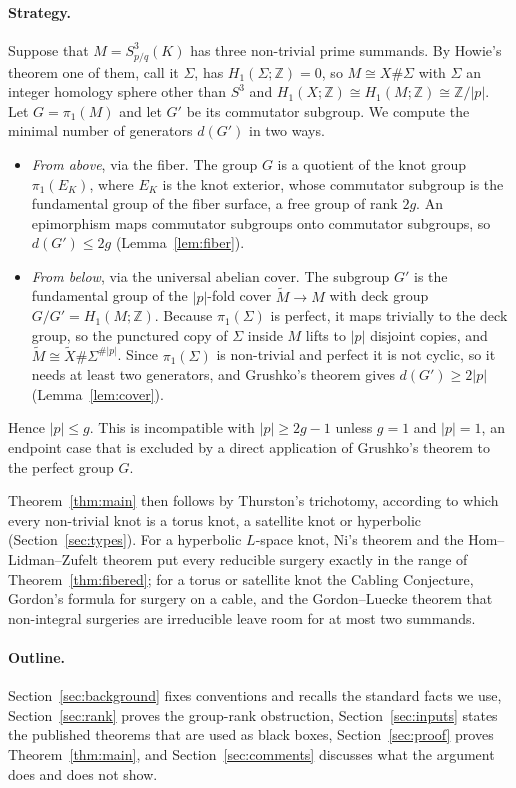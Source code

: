 \documentclass[11pt]{article}
\newcommand{\Z}{\mathbb Z}
\newcommand{\Surg}[2]{S^3_{#1}(#2)}
\newcommand{\rk}{d}
\theoremstyle{definition}
\theoremstyle{remark}
\begin{document}
\paragraph{Strategy.}
Suppose that \(M=\Surg{p/q}{K}\) has three non-trivial prime summands.
By Howie's theorem one of them, call it \(\Sigma\), has
\(H_1(\Sigma;\Z)=0\), so \(M\cong X\#\Sigma\) with \(\Sigma\) an integer
homology sphere other than \(S^3\) and \(H_1(X;\Z)\cong H_1(M;\Z)\cong\Z/|p|\).
Let \(G=\pi_1(M)\) and let \(G'\) be its commutator subgroup. We compute
the minimal number of generators \(\rk(G')\) in two ways.
\begin{itemize}
\item \emph{From above}, via the fiber. The group \(G\) is a quotient of
the knot group \(\pi_1(E_K)\), where \(E_K\) is the knot exterior, whose
commutator subgroup is the
fundamental group of the fiber surface, a free group of rank \(2g\). An
epimorphism maps commutator subgroups onto commutator subgroups, so
\(\rk(G')\leq 2g\) (Lemma~\ref{lem:fiber}).
\item \emph{From below}, via the universal abelian cover. The subgroup
\(G'\) is the fundamental group of the \(|p|\)-fold cover
\(\widetilde M\to M\) with deck group \(G/G'=H_1(M;\Z)\). Because
\(\pi_1(\Sigma)\) is perfect, it maps trivially to the deck group, so the
punctured copy of \(\Sigma\) inside \(M\) lifts to \(|p|\) disjoint copies,
and \(\widetilde M\cong\widetilde X\#\Sigma^{\#|p|}\). Since
\(\pi_1(\Sigma)\) is non-trivial and perfect it is not cyclic, so it needs
at least two generators, and Grushko's theorem gives
\(\rk(G')\geq 2|p|\) (Lemma~\ref{lem:cover}).
\end{itemize}
Hence \(|p|\leq g\). This is incompatible with \(|p|\geq 2g-1\) unless
\(g=1\) and \(|p|=1\), an endpoint case that is excluded by a direct
application of Grushko's theorem to the perfect group \(G\).

Theorem~\ref{thm:main} then follows by Thurston's trichotomy, according
to which every non-trivial knot is a torus knot, a satellite knot or
hyperbolic (Section~\ref{sec:types}). For a hyperbolic \(L\)-space knot, Ni's theorem and the Hom--Lidman--Zufelt
theorem put every reducible surgery exactly in the range of
Theorem~\ref{thm:fibered}; for a torus or satellite knot the Cabling
Conjecture, Gordon's formula for surgery on a cable, and the
Gordon--Luecke theorem that non-integral surgeries are irreducible leave
room for at most two summands.

\paragraph{Outline.}
Section~\ref{sec:background} fixes
conventions and recalls the standard facts we use,
Section~\ref{sec:rank} proves the group-rank obstruction,
Section~\ref{sec:inputs} states the published theorems that are used as
black boxes, Section~\ref{sec:proof} proves Theorem~\ref{thm:main}, and
Section~\ref{sec:comments} discusses what the argument does and does not
show.
\end{document}
